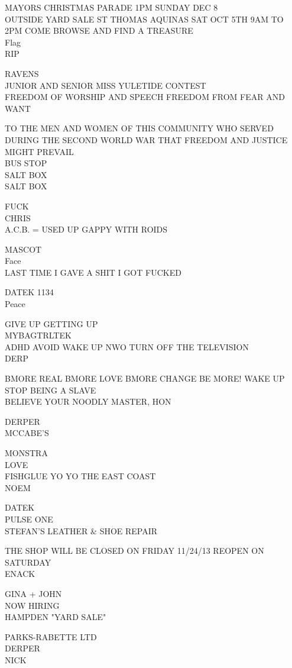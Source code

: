 \documentclass[10pt,letterpaper]{article}
\begin{document}
MAYORS CHRISTMAS PARADE 1PM SUNDAY DEC 8\\
OUTSIDE YARD SALE ST THOMAS AQUINAS SAT OCT 5TH 9AM TO 2PM COME BROWSE AND FIND A TREASURE\\
Flag\\
RIP

RAVENS\\
JUNIOR AND SENIOR MISS YULETIDE CONTEST\\
FREEDOM OF WORSHIP AND SPEECH FREEDOM FROM FEAR AND WANT

TO THE MEN AND WOMEN OF THIS COMMUNITY WHO SERVED DURING THE SECOND WORLD WAR THAT FREEDOM AND JUSTICE MIGHT PREVAIL\\
BUS STOP\\
SALT BOX\\
SALT BOX

FUCK\\
CHRIS\\
A.C.B. = USED UP GAPPY WITH ROIDS

MASCOT\\
Face\\
LAST TIME I GAVE A SHIT I GOT FUCKED

DATEK 1134\\
Peace

GIVE UP GETTING UP\\
MYBAGTRLTEK\\
ADHD AVOID WAKE UP NWO TURN OFF THE TELEVISION\\
DERP

BMORE REAL BMORE LOVE BMORE CHANGE BE MORE! WAKE UP\\
STOP BEING A SLAVE\\
BELIEVE YOUR NOODLY MASTER, HON

DERPER\\
MCCABE'S

MONSTRA\\
LOVE\\
FISHGLUE YO YO THE EAST COAST\\
NOEM

DATEK\\
PULSE ONE\\
STEFAN'S LEATHER \& SHOE REPAIR

THE SHOP WILL BE CLOSED ON FRIDAY 11/24/13 REOPEN ON SATURDAY\\
ENACK

GINA + JOHN\\
NOW HIRING\\
HAMPDEN "YARD SALE"

PARKS{-}RABETTE LTD\\
DERPER\\
NICK
\end{document}
